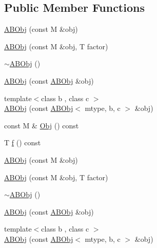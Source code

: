 \subsection*{Public Member Functions}
\begin{DoxyCompactItemize}
\item 
\mbox{\hyperlink{classROOT_1_1Minuit2_1_1ABObj_a48561e673ca2a4a05b9e67af09b1736a}{A\+B\+Obj}} (const M \&obj)
\item 
\mbox{\hyperlink{classROOT_1_1Minuit2_1_1ABObj_a2406012a4e1bd70d0a92c2468eaaee7c}{A\+B\+Obj}} (const M \&obj, T factor)
\item 
\mbox{\hyperlink{classROOT_1_1Minuit2_1_1ABObj_ad6145e561d3c760d83a3481c3933bb98}{$\sim$\+A\+B\+Obj}} ()
\item 
\mbox{\hyperlink{classROOT_1_1Minuit2_1_1ABObj_a2cce5325151c97bcaaec6cb6ecc0cd7b}{A\+B\+Obj}} (const \mbox{\hyperlink{classROOT_1_1Minuit2_1_1ABObj}{A\+B\+Obj}} \&obj)
\item 
{\footnotesize template$<$class b , class c $>$ }\\\mbox{\hyperlink{classROOT_1_1Minuit2_1_1ABObj_af629f9c316122395ab94459e6cf6ed30}{A\+B\+Obj}} (const \mbox{\hyperlink{classROOT_1_1Minuit2_1_1ABObj}{A\+B\+Obj}}$<$ mtype, b, c $>$ \&obj)
\item 
const M \& \mbox{\hyperlink{classROOT_1_1Minuit2_1_1ABObj_a82bf2a4359c24b894e4e8990185432c1}{Obj}} () const
\item 
T \mbox{\hyperlink{classROOT_1_1Minuit2_1_1ABObj_aa640f928a8ec245b70d4ac294e1418e5}{f}} () const
\item 
\mbox{\hyperlink{classROOT_1_1Minuit2_1_1ABObj_a48561e673ca2a4a05b9e67af09b1736a}{A\+B\+Obj}} (const M \&obj)
\item 
\mbox{\hyperlink{classROOT_1_1Minuit2_1_1ABObj_a2406012a4e1bd70d0a92c2468eaaee7c}{A\+B\+Obj}} (const M \&obj, T factor)
\item 
\mbox{\hyperlink{classROOT_1_1Minuit2_1_1ABObj_ad6145e561d3c760d83a3481c3933bb98}{$\sim$\+A\+B\+Obj}} ()
\item 
\mbox{\hyperlink{classROOT_1_1Minuit2_1_1ABObj_a2cce5325151c97bcaaec6cb6ecc0cd7b}{A\+B\+Obj}} (const \mbox{\hyperlink{classROOT_1_1Minuit2_1_1ABObj}{A\+B\+Obj}} \&obj)
\item 
{\footnotesize template$<$class b , class c $>$ }\\\mbox{\hyperlink{classROOT_1_1Minuit2_1_1ABObj_af629f9c316122395ab94459e6cf6ed30}{A\+B\+Obj}} (const \mbox{\hyperlink{classROOT_1_1Minuit2_1_1ABObj}{A\+B\+Obj}}$<$ mtype, b, c $>$ \&obj)
\item 

\end{DoxyCompactItemize}
